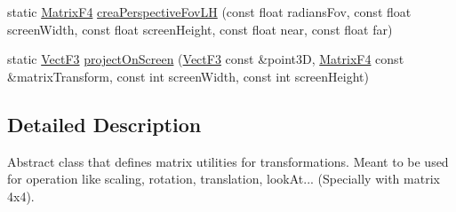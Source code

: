 \begin{DoxyCompactItemize}
\item 
static \hyperlink{classMatrixF4}{Matrix\-F4} \hyperlink{classMatrixTransform_a9ee4b294198e3b4e94e6497819ab2f29}{crea\-Perspective\-Fov\-L\-H} (const float radians\-Fov, const float screen\-Width, const float screen\-Height, const float near, const float far)
\item 
static \hyperlink{classVectF3}{Vect\-F3} \hyperlink{classMatrixTransform_a1f3062abab7dad5f82b9dc2ed3ab3f0b}{project\-On\-Screen} (\hyperlink{classVectF3}{Vect\-F3} const \&point3\-D, \hyperlink{classMatrixF4}{Matrix\-F4} const \&matrix\-Transform, const int screen\-Width, const int screen\-Height)
\end{DoxyCompactItemize}


\subsection{Detailed Description}
Abstract class that defines matrix utilities for transformations. Meant to be used for operation like scaling, rotation, translation, look\-At... (Specially with matrix 4x4).


